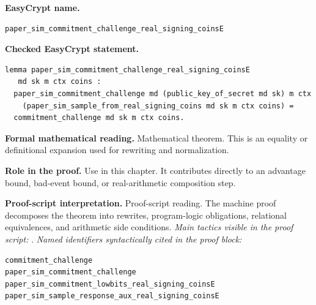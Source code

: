 \begin{formaltheorem}
\noindent\textbf{EasyCrypt name.}
\begin{lstlisting}[language=EasyCrypt,basicstyle=\ttfamily\scriptsize]
paper_sim_commitment_challenge_real_signing_coinsE
\end{lstlisting}
\noindent\textbf{Checked EasyCrypt statement.}
\begin{lstlisting}[language=EasyCrypt,basicstyle=\ttfamily\scriptsize]
lemma paper_sim_commitment_challenge_real_signing_coinsE
   md sk m ctx coins :
  paper_sim_commitment_challenge md (public_key_of_secret md sk) m ctx
    (paper_sim_sample_from_real_signing_coins md sk m ctx coins) =
  commitment_challenge md sk m ctx coins.
\end{lstlisting}
\noindent\textbf{Formal mathematical reading.}
Mathematical theorem. This is an equality or definitional expansion used for rewriting and normalization.

\noindent\textbf{Role in the proof.}
Use in this chapter. It contributes directly to an advantage bound, bad-event bound, or real-arithmetic composition step.

\noindent\textbf{Proof-script interpretation.}
Proof-script reading. The machine proof decomposes the theorem into rewrites, program-logic obligations, relational equivalences, and arithmetic side conditions.
\emph{Main tactics visible in the proof script:} .
\emph{Named identifiers syntactically cited in the proof block:}
\begin{lstlisting}[language=EasyCrypt,basicstyle=\ttfamily\scriptsize]
commitment_challenge
paper_sim_commitment_challenge
paper_sim_commitment_lowbits_real_signing_coinsE
paper_sim_sample_response_aux_real_signing_coinsE
\end{lstlisting}

\end{formaltheorem}

